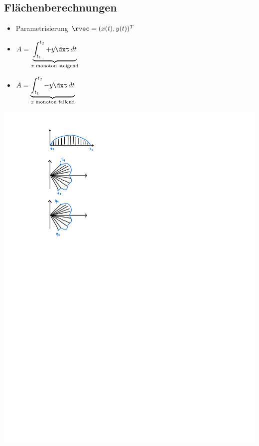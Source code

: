 \subsection{Flächenberechnungen}
    \vspace{0.5em}
    \begin{itemize}
        \item Parametrisierung $\rvec=(x(t),y(t))^T$ \hfill
    \end{itemize}
    \begin{minipage}{0.65\linewidth}
        \vspace{-1em}
        \begin{itemize}
        \item[]  $\displaystyle A= \underbrace{\int_{t_1}^{t_2} + y \dxt \, dt}_{x \textrm{ monoton steigend}}$
        \item[]  $\displaystyle A= \underbrace{\int_{t_1}^{t_2} - y \dxt \, dt}_{x \textrm{ monoton fallend}}$
        \end{itemize}
    \end{minipage}
    \begin{minipage}{0.34\linewidth}
        \includegraphics[width=0.7\linewidth]{src/Integralrechnung/param.pdf}
    \end{minipage}

